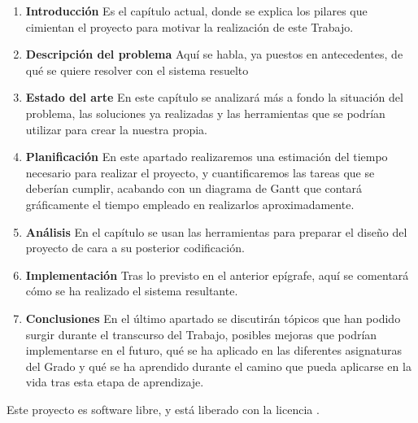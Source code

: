 \begin{enumerate}[C{a}pítulo 1.- ]
	\item \textbf{Introducción} Es el capítulo actual, donde se explica los pilares que cimientan el proyecto para motivar la realización de este Trabajo.
	\item \textbf{Descripción del problema} Aquí se habla, ya puestos en antecedentes, de qué se quiere resolver con el sistema resuelto
	\item \textbf{Estado del arte} En este capítulo se analizará más a fondo la situación del problema, las soluciones ya realizadas y las herramientas que se podrían utilizar para crear la nuestra propia.
	\item \textbf{Planificación} En este apartado realizaremos una estimación del tiempo necesario para realizar el proyecto, y cuantificaremos las tareas que se deberían cumplir, acabando con un diagrama de Gantt que contará gráficamente el tiempo empleado en realizarlos aproximadamente.
	\item \textbf{Análisis} En el capítulo se usan las herramientas para preparar el diseño del proyecto de cara a su posterior codificación.
	\item \textbf{Implementación} Tras lo previsto en el anterior epígrafe, aquí se comentará cómo se ha realizado el sistema resultante.
	\item \textbf{Conclusiones} En el último apartado se discutirán tópicos que han podido surgir durante el transcurso del Trabajo, posibles mejoras que podrían implementarse en el futuro, qué se ha aplicado en las diferentes asignaturas del Grado y qué se ha aprendido durante el camino que pueda aplicarse en la vida tras esta etapa de aprendizaje.
\end{enumerate}

Este proyecto es software libre, y está liberado con la licencia \cite{gplv3}.